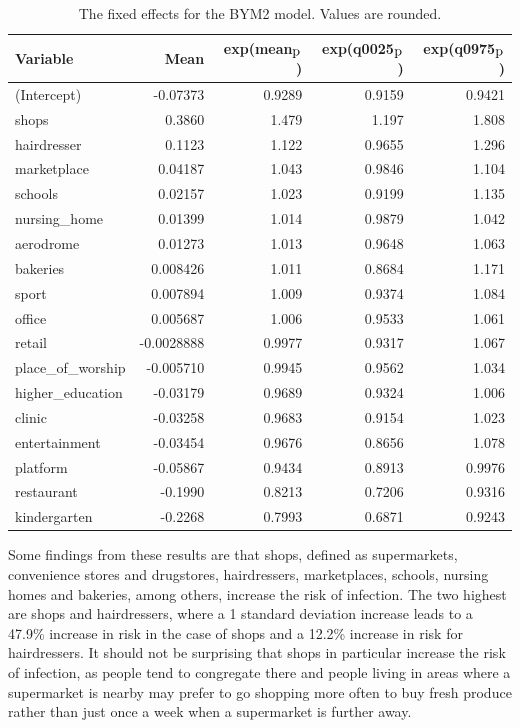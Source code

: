 \begin{table}[H] 
\caption{The fixed effects for the BYM2 model. Values are rounded. \label{fixedInfraGermany}}
\begin{tabular}{l r r r r}
\toprule
\textbf{Variable}	& \textbf{Mean}	& \textbf{exp(mean$_{\hbox{p}}$)} & \textbf{exp(q0025$_{\hbox{p}}$)} & \textbf{exp(q0975$_{\hbox{p}}$)} \\
\midrule
(Intercept) & -0.07373 & 0.9289 & 0.9159 & 0.9421 \\
shops & 0.3860 & 1.479 & 1.197 & 1.808 \\
hairdresser & 0.1123 & 1.122 & 0.9655 & 1.296 \\
marketplace & 0.04187 & 1.043 & 0.9846 & 1.104 \\
schools & 0.02157 & 1.023 & 0.9199 & 1.135 \\
nursing\_home & 0.01399 & 1.014 & 0.9879 & 1.042 \\
aerodrome & 0.01273 & 1.013 & 0.9648 & 1.063 \\
bakeries & 0.008426 & 1.011 & 0.8684 & 1.171 \\
sport & 0.007894 & 1.009 & 0.9374 & 1.084 \\
office & 0.005687 & 1.006 & 0.9533 & 1.061 \\
retail & -0.0028888 & 0.9977 & 0.9317 & 1.067 \\
place\_of\_worship & -0.005710 & 0.9945 & 0.9562 & 1.034 \\
higher\_education & -0.03179 & 0.9689 & 0.9324 & 1.006 \\
clinic & -0.03258 & 0.9683 & 0.9154 & 1.023 \\
entertainment & -0.03454 & 0.9676 & 0.8656 & 1.078 \\
platform & -0.05867 & 0.9434 & 0.8913 & 0.9976 \\
restaurant & -0.1990 & 0.8213 & 0.7206 & 0.9316 \\
kindergarten & -0.2268 & 0.7993 & 0.6871 & 0.9243 \\
\bottomrule
\end{tabular}
\end{table}
Some findings from these results are that shops, defined as supermarkets, convenience stores and drugstores, hairdressers, marketplaces, schools, nursing homes and bakeries, among others, increase the risk of infection. The two highest are shops and hairdressers, where a 1 standard deviation increase leads to a 47.9\% increase in risk in the case of shops and a 12.2\% increase in risk for hairdressers. It should not be surprising that shops in particular increase the risk of infection, as people tend to congregate there and people living in areas where a supermarket is nearby may prefer to go shopping more often to buy fresh produce rather than just once a week when a supermarket is further away. \\
